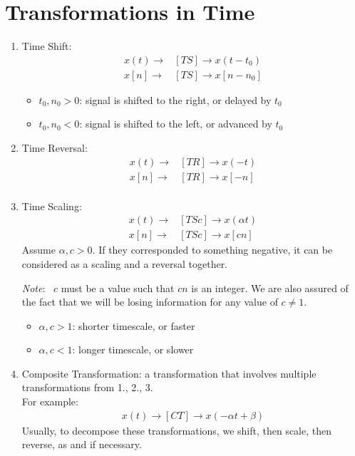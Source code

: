 \documentclass[nobib]{tufte-handout}
\newcommand{\note}[1]{
        \begin{notebox}
        \noindent\textit{Note}:\ #1
        \end{notebox}
}
\begin{document}
\section{Transformations in Time}
\begin{enumerate}
    \item Time Shift:
    \begin{align*}
        x(t) \rightarrow &[TS] \rightarrow x(t-t_0)\\
        x[n] \rightarrow &[TS] \rightarrow x[n-n_0]
    \end{align*}
    \begin{itemize}
        \item $t_0,n_0>0$: signal is shifted to the right, or delayed by $t_0$
        \item $t_0, n_0<0$: signal is shifted to the left, or advanced by $t_0$
    \end{itemize}
    \item Time Reversal:
    \begin{align*}
        x(t)\rightarrow &[TR]\rightarrow x(-t)\\
        x[n]\rightarrow &[TR]\rightarrow x[-n]\\
    \end{align*}
    \item Time Scaling:
    \begin{align*}
        x(t)\rightarrow &[TSc]\rightarrow x(\alpha t)\\
        x[n]\rightarrow &[TSc]\rightarrow x[c n]
    \end{align*}
    Assume $\alpha, c >0$. If they corresponded to something negative, it can be considered as a scaling and a reversal together.\\
    \note{ $c$ must be a value such that $cn$ is an integer. We are also assured of the fact that we will be losing information for any value of $c\neq 1$.}
    \begin{itemize}
        \item $\alpha, c >1$: shorter timescale, or faster
        \item $\alpha, c <1$: longer timescale, or slower
    \end{itemize}
    \item Composite Transformation: a transformation that involves multiple transformations from 1., 2., 3.\\
    For example:
    \begin{align*}
        x(t)\rightarrow[CT]\rightarrow x(-\alpha t + \beta)
    \end{align*}
    Usually, to decompose these transformations, we shift, then scale, then reverse, as and if necessary.
\end{enumerate}
\end{document}
